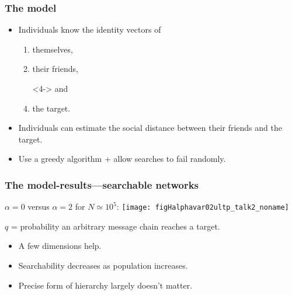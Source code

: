 \begin{frame}
  \frametitle{The model}

  \begin{itemize}
  \item<1-> 
    Individuals know the identity
    vectors of
    \begin{enumerate}
    \item<2-> 
      themselves,
    \item<3->  
      their friends,
    \item[]<4->  
      and
    \item<4->  
      the target.
    \end{enumerate}
  \item<5->
    Individuals can estimate the social distance
    between their friends and the target.
  \item<6->
    Use a greedy algorithm + allow searches to fail randomly.
  \end{itemize}
  
\end{frame}


\begin{frame}
   \frametitle{The model-results---searchable networks}
 
   $\alpha=0$ versus $\alpha=2$ for $N \simeq 10^5$:
   \centering
   \texttt{[image: figHalphavar02ultp\_talk2\_noname]}%

$q$ = probability an arbitrary message
chain reaches a target.

\begin{itemize}
\item<1-> A few dimensions help.\\
\item<1-> Searchability decreases as population increases.\\
\item<1-> Precise form of hierarchy largely doesn't matter.
\end{itemize}

\end{frame}

